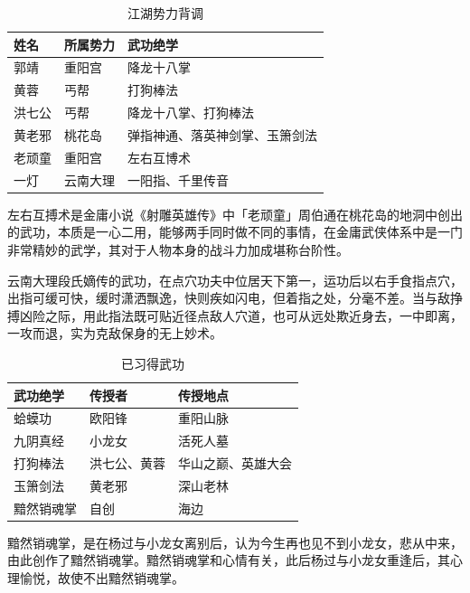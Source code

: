 \documentclass[QingNianC, vlined, timesmathnogreek]{nsfc}
\begin{document}
	\begin{table}[!ht]
		\caption{江湖势力背调} \label{tab: 江湖势力背调}
		\begin{threeparttable}
			\begin{tabular}{p{2cm} p{3cm}<{\centering} p{7cm}<{\raggedleft}}
				\toprule
				\textbf{姓名} & \textbf{所属势力} & \textbf{武功绝学} \\
				\midrule
				郭靖 & 重阳宫 & 降龙十八掌 \\
				黄蓉 & 丐帮 & 打狗棒法 \\
				洪七公 & 丐帮 & 降龙十八掌、打狗棒法 \\
				黄老邪 & 桃花岛 & 弹指神通、落英神剑掌、玉箫剑法 \\
				老顽童 & 重阳宫 & 左右互博术\tnote{1} \\
				一灯 & 云南大理 & 一阳指\tnote{2}、千里传音 \\
				\bottomrule
			\end{tabular}
			\begin{tablenotes}
				\item[1] 左右互搏术是金庸小说《射雕英雄传》中「老顽童」周伯通在桃花岛的地洞中创出的武功，本质是一心二用，能够两手同时做不同的事情，在金庸武侠体系中是一门非常精妙的武学，其对于人物本身的战斗力加成堪称台阶性。
				\item[2] 云南大理段氏嫡传的武功，在点穴功夫中位居天下第一，运功后以右手食指点穴，出指可缓可快，缓时潇洒飘逸，快则疾如闪电，但着指之处，分毫不差。当与敌挣搏凶险之际，用此指法既可贴近径点敌人穴道，也可从远处欺近身去，一中即离，一攻而退，实为克敌保身的无上妙术。
			\end{tablenotes}
		\end{threeparttable}
	\end{table}
	
	\begin{table}[!ht]
		\caption{已习得武功} \label{tab: 已习得武功}
		\begin{threeparttable}
			\begin{tabular}{p{3cm} p{3cm} p{5cm}}
				\toprule
				\textbf{武功绝学} & \textbf{传授者} & \textbf{传授地点} \\
				\midrule
				蛤蟆功 & 欧阳锋 & 重阳山脉 \\
				九阴真经 & 小龙女 & 活死人墓 \\
				打狗棒法 & 洪七公、黄蓉 & 华山之巅、英雄大会 \\
				玉箫剑法 & 黄老邪 & 深山老林 \\
				黯然销魂掌\tnote{1} & 自创 & 海边 \\
				\bottomrule
			\end{tabular}
			\begin{tablenotes}[online]
				\item[1] 黯然销魂掌，是在杨过与小龙女离别后，认为今生再也见不到小龙女，悲从中来，由此创作了黯然销魂掌。黯然销魂掌和心情有关，此后杨过与小龙女重逢后，其心理愉悦，故使不出黯然销魂掌。
			\end{tablenotes}
		\end{threeparttable}
	\end{table}
\end{document}
